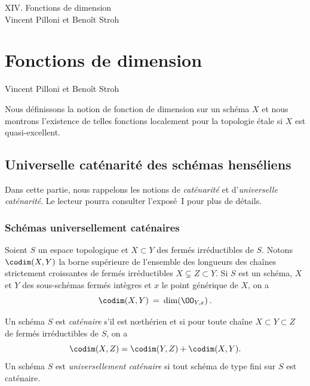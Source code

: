 \documentclass[10pt]{../fichiers-configuration-latex/smfart}
\begin{document}
\begin{center}
XIV. Fonctions de dimension\\
Vincent Pilloni et Benoît Stroh
\end{center}

\else
{}
\chapter{Fonctions de dimension}
\begin{center}
Vincent Pilloni et Benoît Stroh
\end{center}
\fi


Nous définissons la notion de fonction de dimension sur un schéma $X$ et nous montrons l'existence
de telles fonctions localement pour la topologie étale si $X$ est quasi-excellent.


\section{Universelle caténarité des schémas henséliens}

Dans cette partie, nous rappelons les notions de \emph{caténarité} et d'\emph{universelle
caténarité}.
Le lecteur pourra consulter l'exposé~I pour plus de détails.

\subsection{Schémas universellement caténaires}


Soient $S$ un espace topologique et $X\subset Y$ des fermés irréductibles de $S$. Notons
$\codim(X,Y)$ la borne supérieure de l'ensemble des longueurs des chaînes strictement croissantes
de fermés irréductibles $X\varsubsetneq Z \subset Y$. Si $S$ est un schéma,  $X$ et $Y$ des
sous-schémas fermés intègres et $x$ le point générique de $X$, on a
$$\codim(X,Y)\:=\:\dim(\OO_{Y,x})\: .$$

\begin{definition2}[\egazero{iv}{14.3.2}] \label{14-definition-catenaire} Un schéma $S$ est
\emph{caténaire} s'il est nœthérien et si pour toute chaîne $X\subset Y\subset Z$ de fermés
irréductibles de $S$, on a $$\codim(X,Z)=\codim(Y,Z)+\codim(X,Y).$$ Un schéma $S$ est
\emph{universellement caténaire} si tout schéma de type fini sur $S$ est caténaire.
\end{definition2}
\end{document}
